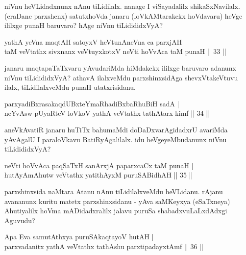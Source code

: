 \begin{artha}
niVnu heVLidadxnunx nAnu tiLidilalx. nanage I viSayadalilx 
shikaSxNavilalx. (eraDane parxshenx) satutxhoVda janaru 
(loVkAMtarakekx hoVdavaru) heVge ililxge punaH baruvaro? hAge niVnu 
tiLidididxVyA?
\end{artha}


\begin{shl}
yathA yeVna maqtAH satoyxV heVtunA\s neVna ca parxjAH | \\
taM veVtathx sivxnanx veVtuyxkotxV neVti hoVvAca taM punaH \hfill|| 33 || 
\end{shl}

\begin{artha}
janaru maqtapaTaTxvaru yAvudariMda hiMdakekx ililxge baruvaro adanunx 
niVnu tiLidididxVyA? athavA ilalxveMdu parxshinxsidAga shevxVtakeVtuvu 
ilalx, tiLidilalxveMdu punaH utatxrisidanu.
\end{artha}


\begin{shl}
parxyadiBxrasakaqdUBxteYmaRhadiBxbaRhuBiH sadA | \\
neYvAsw pUyaRteV loVkoV yathA veVtathx tathA\s tarx kimf \hfill|| 34 || 
\end{shl}

\begin{artha}
aneVkAvatiR janaru huTiTx bahumaMdi doDaDxvarAgidadxrU avariMda 
yAvAgalU I paraloVkavu BatiRyAgalilalx. idu heVgeyeMbudanunx niVnu 
tiLidididxVyA?
\end{artha}


\begin{shl}
neVti hoVvAca paqSaTxH sanArxjA paparxcaCx taM punaH | \\
hutAyAmAhutw veVtathx yatithAyxM puruSABidhAH \hfill|| 35 || 
\end{shl}

\begin{artha}
parxshinxsida naMtara Atanu nAnu tiLidilalxveMdu heVLidanu. rAjanu 
avananunx kuritu matetx parxshinxsidanu - yAva saMKeyxya (eSaTxneya) 
Ahutiyalilx hoVma mADidadxralilx jalavu puruSa shabadxvuLaLxdAdxgi 
Aguvudu?
\end{artha}


\begin{shl}
Apa Eva samutAthxya puruSAkaqtayoV hutAH | \\
parxvadanitx yathA veVtathx tathA\s \s shu parxtipadayxtAmf \hfill|| 36 || 
\end{shl}


